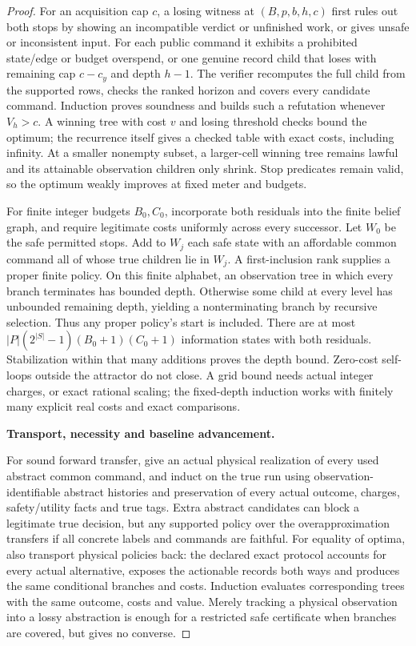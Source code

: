 \begin{proof}
For an acquisition cap \(c\), a losing witness at \((B,p,b,h,c)\) first rules out both stops by showing an incompatible verdict or unfinished work, or gives unsafe or inconsistent input. For each public command it exhibits a prohibited state/edge or budget overspend, or one genuine record child that loses with remaining cap \(c-c_y\) and depth \(h-1\). The verifier recomputes the full child from the supported rows, checks the ranked horizon and covers every candidate command. Induction proves soundness and builds such a refutation whenever \(V_h>c\). A winning tree with cost \(v\) and losing threshold checks bound the optimum; the recurrence itself gives a checked table with exact costs, including infinity. At a smaller nonempty subset, a larger-cell winning tree remains lawful and its attainable observation children only shrink. Stop predicates remain valid, so the optimum weakly improves at fixed meter and budgets.

For finite integer budgets \(B_0,C_0\), incorporate both residuals into the finite belief graph, and require legitimate costs uniformly across every successor. Let \(W_0\) be the safe permitted stops. Add to \(W_j\) each safe state with an affordable common command all of whose true children lie in \(W_j\). A first-inclusion rank supplies a proper finite policy. On this finite alphabet, an observation tree in which every branch terminates has bounded depth. Otherwise some child at every level has unbounded remaining depth, yielding a nonterminating branch by recursive selection. Thus any proper policy's start is included. There are at most \(|P|(2^{|S|}-1)(B_0+1)(C_0+1)\) information states with both residuals. Stabilization within that many additions proves the depth bound. Zero-cost self-loops outside the attractor do not close. A grid bound needs actual integer charges, or exact rational scaling; the fixed-depth induction works with finitely many explicit real costs and exact comparisons.

\textbf{Transport, necessity and baseline advancement.}

For sound forward transfer, give an actual physical realization of every used abstract common command, and induct on the true run using observation-identifiable abstract histories and preservation of every actual outcome, charges, safety/utility facts and true tags. Extra abstract candidates can block a legitimate true decision, but any supported policy over the overapproximation transfers if all concrete labels and commands are faithful. For equality of optima, also transport physical policies back: the declared exact protocol accounts for every actual alternative, exposes the actionable records both ways and produces the same conditional branches and costs. Induction evaluates corresponding trees with the same outcome, costs and value. Merely tracking a physical observation into a lossy abstraction is enough for a restricted safe certificate when branches are covered, but gives no converse.


\end{proof}
